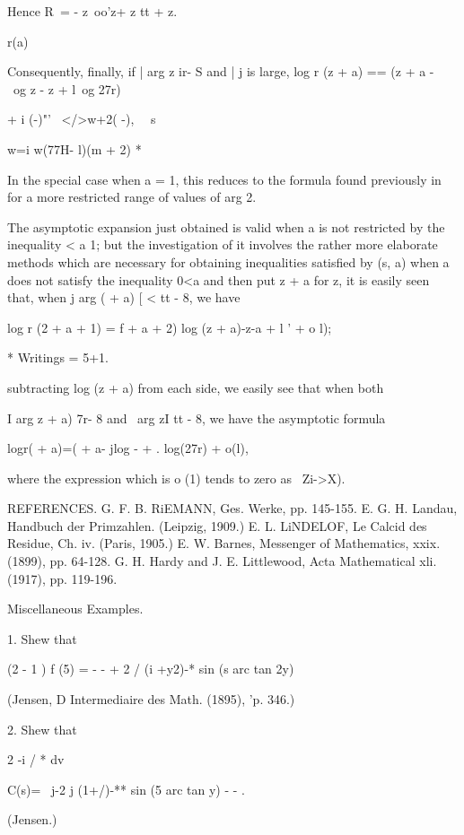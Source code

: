 {{Hence R\ = - z\ oo'z+ z tt + z.

r(a)

Consequently, finally, if | arg z ir- S and | j is large, log r (z +
a) == (z + a -~ \ og z - z + l\ og 27r)

+ i (-)"'~ </>w+2( -), \ \ s

w=i w(77H- l)(m + 2) *

In the special case when a = 1, this reduces to the formula found
previously in for a more restricted range of values of arg 2.

The asymptotic expansion just obtained is valid when a is not
restricted by the inequality < a 1; but the investigation of it
involves the rather more elaborate methods which are necessary for
obtaining inequalities satisfied by (s, a) when a does not satisfy the
inequality 0<a%
and then put z + a for z, it is easily seen that, when j arg ( + a) [
< tt - 8, we have

log r (2 + a + 1) = f + a + 2) log (z + a)-z-a + l ' + o l);

* Writings = 5+1.

%
%

subtracting log (z + a) from each side, we easily see that when both

I arg z + a) 7r- 8 and \ arg zI tt - 8, we have the asymptotic formula

logr( + a)=( + a- jlog - + . log(27r) + o(l),

where the expression which is o (1) tends to zero as \ Zi->X).

REFERENCES. G. F. B. RiEMANN, Ges. Werke, pp. 145-155. E. G. H.
Landau, Handbuch der Primzahlen. (Leipzig, 1909.) E. L. LiNDELOF, Le
Calcid des Residue, Ch. iv. (Paris, 1905.) E. W. Barnes, Messenger of
Mathematics, xxix. (1899), pp. 64-128. G. H. Hardy and J. E.
Littlewood, Acta Mathematical xli. (1917), pp. 119-196.

Miscellaneous Examples.

1. Shew that

(2 - 1 ) f (5) = - - + 2 / (i +y2)-* sin (s arc tan 2y)

(Jensen, D Intermediaire des Math. (1895), 'p. 346.)

2. Shew that

2 -i / * dv

C(s)= \ j-2 j (1+/)-** sin (5 arc tan y) - - .

(Jensen.)

}}
